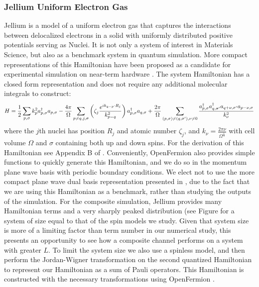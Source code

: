 \subsubsection{Jellium Uniform Electron Gas}
Jellium is a model of a uniform electron gas that captures the interactions between delocalized electrons in a solid with uniformly distributed positive potentials serving as Nuclei. It is not only a system of interest in Materials Science, but also as a benchmark system in quantum simulation. More compact representations of this Hamiltonian have been proposed as a candidate for experimental simulation on near-term hardware \cite{babbush2018low}. The system Hamiltonian has a closed form representation and does not require any additional molecular integrals to construct:
\begin{equation}
    H = \frac{1}{2} \sum_{p, \sigma} k^2_p a^\dagger_{p, \sigma} a_{p, \sigma} - \frac{4\pi}{\Omega}\sum_{p\neq q, j, \sigma} \left( \zeta_j \frac{e^{ik_{q-p} \cdot R_j}}{k^2_{p-q}} \right) a^\dagger_{p, \sigma} a_{q, \sigma} + \frac{2\pi}{\Omega} \sum_{(p,\sigma)\neq (q, \sigma '), \nu \neq 0} \frac{a^\dagger_{p, \sigma} a^\dagger_{q, \sigma '} a_{q+\nu, \sigma '} a_{p -\nu, \sigma}}{k_\nu^2}
\end{equation}
where the $j$th nuclei has position $R_j$ and atomic number $\zeta_j$, and $k_\nu=\frac{2\pi \nu}{\Omega^{\frac{1}{3}}}$ with cell volume $\Omega$ and $\sigma$ containing both up and down spins. For the derivation of this Hamiltonian see Appendix B of \cite{babbush2018low}. Conveniently, OpenFermion also provides simple functions to quickly generate this Hamiltonian, and we do so in the momentum plane wave basis with periodic boundary conditions. We elect not to use the more compact plane wave dual basis representation presented in \cite{babbush2018low}, due to the fact that we are using this Hamiltonian as a benchmark, rather than studying the outputs of the simulation. For the composite simulation, Jellium provides many Hamiltonian terms and a very sharply peaked distribution (see Figure  for a system of size equal to that of the spin models we study. Given that system size is more of a limiting factor than term number in our numerical study, this presents an opportunity to see how a composite channel performs on a system with greater $L$. To limit the system size we also use a spinless model, and then perform the Jordan-Wigner transformation on the second quantized Hamiltonian to represent our Hamiltonian as a sum of Pauli operators. This Hamiltonian is constructed with the necessary transformations using OpenFermion \cite{mcclean2020openfermion}.

